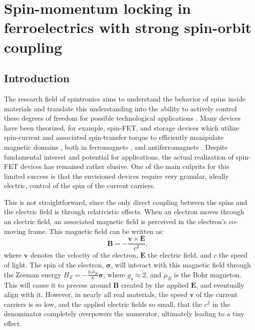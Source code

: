 \newcommand{\Unkr}{u_n(\bm{k}, \bm{r})}
\newcommand{\Eikr}{e^{i\bm{k}\cdot\bm{r}}}
\chapter{Spin-momentum locking in ferroelectrics with strong spin-orbit coupling\label{ch:Rashba}}
\section{Introduction}
The research field of spintronics aims to understand the behavior of spins inside materials and translate this understanding into the ability to actively control these degrees of freedom for possible technological applications \cite{Joshi2016}.
Many devices have been theorized, for example, spin-\gls{FET}\cite{Datta1990}, and storage devices  which utilize spin-current and associated spin-transfer torque to efficiently manipulate magnetic domains \cite{Kent2015}, both in ferromagnets \cite{Nunez2011}, and antiferromagnets \cite{Nunez2006TheorySemiconductors,Nunez2006TheoryMetals, Jungwirth2016}.
Despite fundamental interest and potential for applications, the actual realization of spin-\gls{FET} devices has remained rather elusive.
One of the main culprits for this limited success is that the envisioned devices require very granular, ideally electric, control of the spin of the current carriers.

This is not straightforward, since the only direct coupling between the spins and the electric field is through relativistic effects. When an electron moves through an electric field, an associated magnetic field is perceived in the electron's co-moving frame. This magnetic field can be written as:
\begin{equation}
	\label{eq:Rashba_B}
	\bm{B} = - \frac{\bm v \times \bm E}{c^2},
\end{equation}
where $\bm v$ denotes the velocity of the electron, $\bm E$ the electric field, and $c$ the speed of light.
The spin of the electron, $\bm{\sigma}$, will interact with this magnetic field through the Zeeman energy $H_Z = -\frac{g_s\mu_B}{\hbar} \bm{\sigma}$, where $g_s \approx 2$, and $\mu_B$ is the Bohr magneton.
This will cause it to precess around $\bm B$ created by the applied $\bm E$, and eventually align with it.
However, in nearly all real materials, the speed $\bm v$ of the current carriers is so low, and the applied electric fields so small, that the $c^2$ in the denominator completely overpowers the numerator, ultimately leading to a tiny effect.

